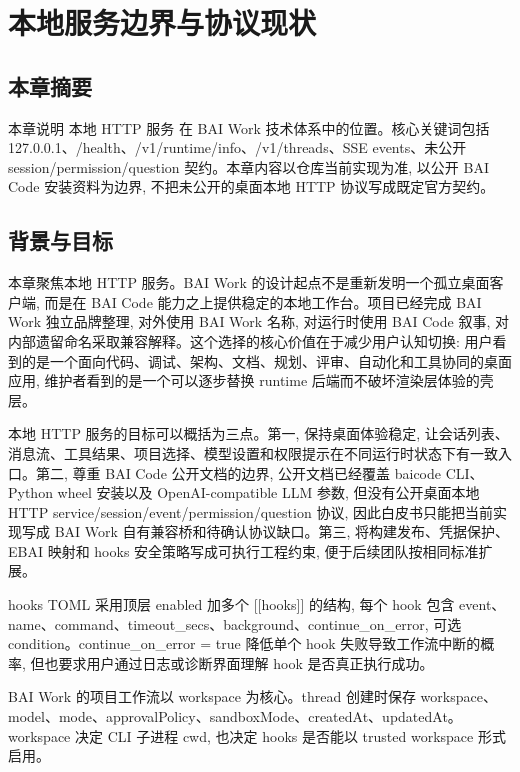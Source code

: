 \chapter{本地服务边界与协议现状}
\section{本章摘要}
本章说明 本地 HTTP 服务 在 BAI Work 技术体系中的位置。核心关键词包括 127.0.0.1、/health、/v1/runtime/info、/v1/threads、SSE events、未公开 session/permission/question 契约。本章内容以仓库当前实现为准, 以公开 BAI Code 安装资料为边界, 不把未公开的桌面本地 HTTP 协议写成既定官方契约。

\section{背景与目标}
本章聚焦本地 HTTP 服务。BAI Work 的设计起点不是重新发明一个孤立桌面客户端, 而是在 BAI Code 能力之上提供稳定的本地工作台。项目已经完成 BAI Work 独立品牌整理, 对外使用 BAI Work 名称, 对运行时使用 BAI Code 叙事, 对内部遗留命名采取兼容解释。这个选择的核心价值在于减少用户认知切换: 用户看到的是一个面向代码、调试、架构、文档、规划、评审、自动化和工具协同的桌面应用, 维护者看到的是一个可以逐步替换 runtime 后端而不破坏渲染层体验的壳层。

本地 HTTP 服务的目标可以概括为三点。第一, 保持桌面体验稳定, 让会话列表、消息流、工具结果、项目选择、模型设置和权限提示在不同运行时状态下有一致入口。第二, 尊重 BAI Code 公开文档的边界, 公开文档已经覆盖 baicode CLI、Python wheel 安装以及 OpenAI-compatible LLM 参数, 但没有公开桌面本地 HTTP service/session/event/permission/question 协议, 因此白皮书只能把当前实现写成 BAI Work 自有兼容桥和待确认协议缺口。第三, 将构建发布、凭据保护、EBAI 映射和 hooks 安全策略写成可执行工程约束, 便于后续团队按相同标准扩展。

hooks TOML 采用顶层 enabled 加多个 [[hooks]] 的结构, 每个 hook 包含 event、name、command、timeout\_secs、background、continue\_on\_error, 可选 condition。continue\_on\_error = true 降低单个 hook 失败导致工作流中断的概率, 但也要求用户通过日志或诊断界面理解 hook 是否真正执行成功。

BAI Work 的项目工作流以 workspace 为核心。thread 创建时保存 workspace、model、mode、approvalPolicy、sandboxMode、createdAt、updatedAt。workspace 决定 CLI 子进程 cwd, 也决定 hooks 是否能以 trusted workspace 形式启用。

